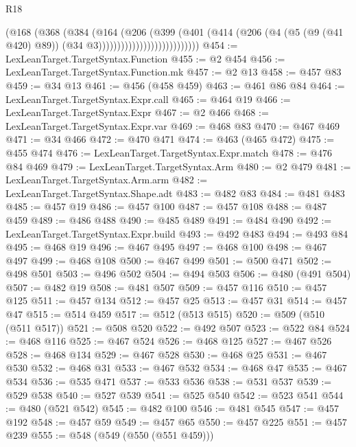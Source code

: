 \begin{lexlean}{R18}
\begin{coremodule}
{{{{{{{{{{{{{{{{{{{{{{{{{{{{{{{{{{{{{{{{{{{{{{{{{{{{{{{{{{{{{{{{{{{{{{{{{{{{{{{{{{{{{{{{{{{{{{{{{{{{{{{{{{{{{                                    (@168
                                      (@368
                                        (@384
                                          (@164
                                            (@206
                                              (@399
                                                (@401
                                                  (@414
                                                    (@206
                                                      (@4
                                                        (@5 (@9 (@41 @420) @89))
                                                        (@34 @3)))))))))))))))))))))))))))
@454 := LexLeanTarget.TargetSyntax.Function
@455 := @2 @454
@456 := LexLeanTarget.TargetSyntax.Function.mk
@457 := @2 @13
@458 := @457 @83
@459 := @34 @13
@461 := @456 (@458 @459)
@463 := @461 @86 @84
@464 := LexLeanTarget.TargetSyntax.Expr.call
@465 := @464 @19
@466 := LexLeanTarget.TargetSyntax.Expr
@467 := @2 @466
@468 := LexLeanTarget.TargetSyntax.Expr.var
@469 := @468 @83
@470 := @467 @469
@471 := @34 @466
@472 := @470 @471
@474 := @463 (@465 @472)
@475 := @455 @474
@476 := LexLeanTarget.TargetSyntax.Expr.match
@478 := @476 @84 @469
@479 := LexLeanTarget.TargetSyntax.Arm
@480 := @2 @479
@481 := LexLeanTarget.TargetSyntax.Arm.arm
@482 := LexLeanTarget.TargetSyntax.Shape.adt
@483 := @482 @83
@484 := @481 @483
@485 := @457 @19
@486 := @457 @100
@487 := @457 @108
@488 := @487 @459
@489 := @486 @488
@490 := @485 @489
@491 := @484 @490
@492 := LexLeanTarget.TargetSyntax.Expr.build
@493 := @492 @483
@494 := @493 @84
@495 := @468 @19
@496 := @467 @495
@497 := @468 @100
@498 := @467 @497
@499 := @468 @108
@500 := @467 @499
@501 := @500 @471
@502 := @498 @501
@503 := @496 @502
@504 := @494 @503
@506 := @480 (@491 @504)
@507 := @482 @19
@508 := @481 @507
@509 := @457 @116
@510 := @457 @125
@511 := @457 @134
@512 := @457 @25
@513 := @457 @31
@514 := @457 @47
@515 := @514 @459
@517 := @512 (@513 @515)
@520 := @509 (@510 (@511 @517))
@521 := @508 @520
@522 := @492 @507
@523 := @522 @84
@524 := @468 @116
@525 := @467 @524
@526 := @468 @125
@527 := @467 @526
@528 := @468 @134
@529 := @467 @528
@530 := @468 @25
@531 := @467 @530
@532 := @468 @31
@533 := @467 @532
@534 := @468 @47
@535 := @467 @534
@536 := @535 @471
@537 := @533 @536
@538 := @531 @537
@539 := @529 @538
@540 := @527 @539
@541 := @525 @540
@542 := @523 @541
@544 := @480 (@521 @542)
@545 := @482 @100
@546 := @481 @545
@547 := @457 @192
@548 := @457 @59
@549 := @457 @65
@550 := @457 @225
@551 := @457 @239
@555 := @548 (@549 (@550 (@551 @459)))
}}}}}}}}}}}}}}}}}}}}}}}}}}}}}}}}}}}}}}}}}}}}}}}}}}}}}}}}}}}}}}}}}}}}}}}}}}}}}}}}}}}}}}}}}}}}}}}}}}}}}}}}}}}}}
\end{coremodule}
\end{lexlean}
